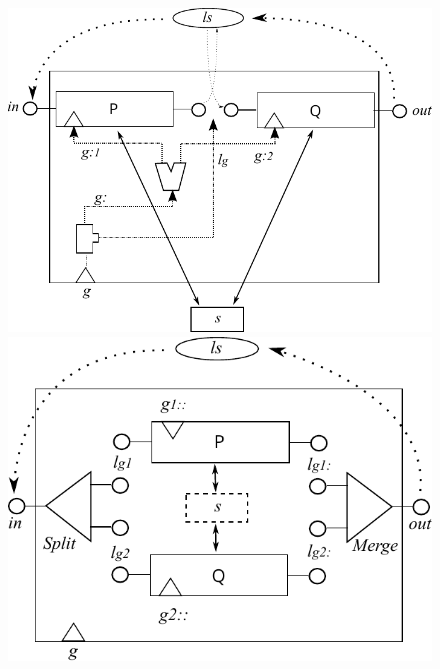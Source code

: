 \begin{figure}[h]%
  \centering
  \parbox{1.2in}{\includegraphics[scale=0.4]{images/seq-comp-actual}}%
  \qquad\qquad
  \begin{minipage}{1.2in}%
    \includegraphics[scale=0.4]{images/par-comp-actual}
  \end{minipage}%
  \label{fig:new-and-split}%
\end{figure}
